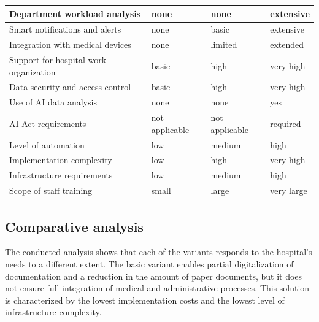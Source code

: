 \begin{longtable}{|p{4cm}|p{3cm}|p{3cm}|p{3cm}|}
    Department workload analysis &
    none &
    none &
    extensive \\
    \hline

    Smart notifications and alerts &
    none &
    basic &
    extensive \\
    \hline

    Integration with medical devices &
    none &
    limited &
    extended \\
    \hline

    Support for hospital work organization &
    basic &
    high &
    very high \\
    \hline

    Data security and access control &
    basic &
    high &
    very high \\
    \hline

    Use of AI data analysis &
    none &
    none &
    yes \\
    \hline

    AI Act requirements &
    not applicable &
    not applicable &
    required \\
    \hline

    Level of automation &
    low &
    medium &
    high \\
    \hline

    Implementation complexity &
    low &
    high &
    very high \\
    \hline

    Infrastructure requirements &
    low &
    medium &
    high \\
    \hline

    Scope of staff training &
    small &
    large &
    very large \\
    \hline

    \end{longtable}

    \subsection{Comparative analysis}

    The conducted analysis shows that each of the variants responds to the hospital's needs to a different extent. The basic variant enables partial digitalization of documentation and a reduction in the amount of paper documents, but it does not ensure full integration of medical and administrative processes. This solution is characterized by the lowest implementation costs and the lowest level of infrastructure complexity.


